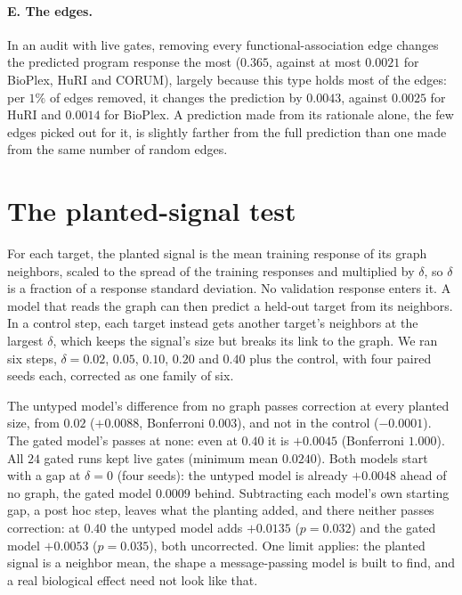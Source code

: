 \documentclass{article}
\begin{document}
\paragraph{E. The edges.} In an audit with live gates, removing every functional-association edge changes
the predicted program response the most ($0.365$, against at most $0.0021$ for BioPlex, HuRI and CORUM),
largely because this type holds most of the edges: per $1\%$ of edges removed, it changes the prediction by
$0.0043$, against $0.0025$ for HuRI and $0.0014$ for BioPlex. A prediction made from its rationale alone,
the few edges picked out for it, is slightly farther from the full prediction than one made from the same
number of random edges.

\section{The planted-signal test}
\label{app:floor}

For each target, the planted signal is the mean training response of its graph neighbors, scaled to the
spread of the training responses and multiplied by $\delta$, so $\delta$ is a fraction of a response
standard deviation. No validation response enters it. A model that reads the graph can then predict a
held-out target from its neighbors. In a control step, each target instead gets another target's
neighbors at the largest $\delta$, which keeps the signal's size but breaks its link to the graph. We ran
six steps, $\delta=0.02$, $0.05$, $0.10$, $0.20$ and $0.40$ plus the control, with four paired seeds
each, corrected as one family of six.

The untyped model's difference from no graph passes correction at every planted size, from $0.02$
($+0.0088$, Bonferroni $0.003$), and not in the control ($-0.0001$). The gated model's passes at none: even
at $0.40$ it is $+0.0045$ (Bonferroni $1.000$). All $24$ gated runs kept live gates (minimum mean
$0.0240$). Both models start with a gap at $\delta=0$ (four seeds): the untyped model is already $+0.0048$
ahead of no graph, the gated model $0.0009$ behind. Subtracting each model's own starting gap, a post hoc
step, leaves what the planting added, and there neither passes correction: at $0.40$ the untyped model
adds $+0.0135$ ($p{=}0.032$) and the gated model $+0.0053$ ($p{=}0.035$), both uncorrected. One limit
applies: the planted signal is a neighbor mean, the shape a message-passing model is built to find, and a
real biological effect need not look like that.
\end{document}
